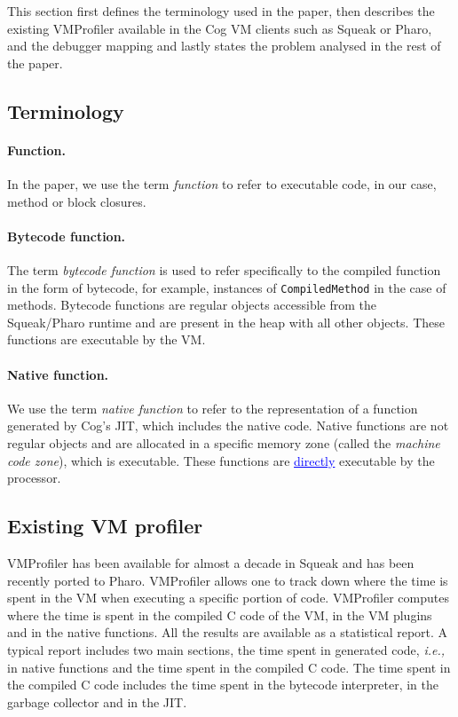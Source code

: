 \documentclass[10pt,preprint,nonatbib]{sigplanconf}
\newcommand{\ct}{\lstinline[backgroundcolor=\color{white},basicstyle=\small\ttfamily]}
\newcommand{\ins}[1]{\textcolor{blue}{\uline{#1}}} %
\newcommand{\ie}{\emph{i.e.,}\xspace}
\begin{document}
This section first defines the terminology used in the paper, then describes the existing VMProfiler available in the Cog VM clients such as Squeak or Pharo, and the debugger mapping and lastly states the problem analysed in the rest of the paper.

\subsection{Terminology}

\paragraph{Function.} In the paper, we use the term \emph{function} to refer to executable code, in our case, method or block closures.

\paragraph{Bytecode function.} The term \emph{bytecode function} is used to refer specifically to the compiled function in the form of bytecode, for example, instances of \ct{CompiledMethod} in the case of methods. Bytecode functions are regular objects accessible from the Squeak/Pharo runtime and are present in the heap with all other objects. These functions are executable by the VM.

\paragraph{Native function.} We use the term \emph{native function} to refer to the representation of a function generated by Cog's JIT, which includes the native code. Native functions are not regular objects and are allocated in a specific memory zone (called the \emph{machine code zone}), which is executable. These functions are \ins{directly} executable by the processor.

\subsection{Existing VM profiler}

VMProfiler has been available for almost a decade in Squeak and has been recently ported to Pharo. VMProfiler allows one to track down where the time is spent in the VM when executing a specific portion of code. VMProfiler computes where the time is spent in the compiled C code of the VM, in the VM plugins and in the native functions. All the results are available as a statistical report. A typical report includes two main sections, the time spent in generated code, \ie in native functions and the time spent in the compiled C code. The time spent in the compiled C code includes the time spent in the bytecode interpreter, in the garbage collector and in the JIT. 
 
\end{document}
